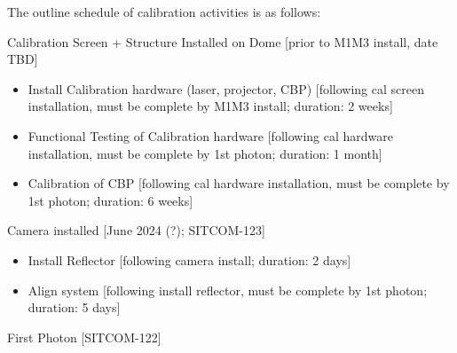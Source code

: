 \documentclass[SE,authoryear,toc,lsstdraft]{lsstdoc}
\begin{document}

The outline schedule of calibration activities is as follows:

Calibration Screen + Structure Installed on Dome [prior to M1M3 install, date TBD]

\begin{itemize}

  \item Install Calibration hardware (laser, projector, CBP) [following cal screen installation, must be complete by M1M3 install; duration: 2 weeks]

  \item Functional Testing of Calibration hardware [following cal hardware installation, must be complete by 1st photon; duration: 1 month]

  \item Calibration of CBP [following cal hardware installation, must be complete by 1st photon; duration: 6 weeks]

\end{itemize}

Camera installed [June 2024 (?); SITCOM-123]

\begin{itemize}

  \item Install Reflector [following camera install; duration: 2 days]

  \item Align system [following install reflector, must be complete by 1st photon; duration: 5 days]

\end{itemize}

First Photon [SITCOM-122]
\end{document}
